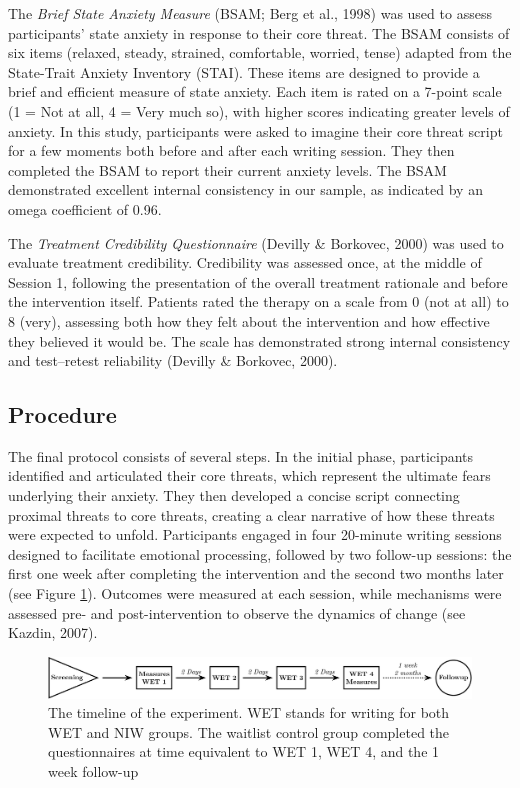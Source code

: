 \documentclass[
  man,floatsintext]{apa7}
\begin{document}
The \emph{Brief State Anxiety Measure} (BSAM; Berg et al., 1998) was used to assess participants' state anxiety in response to their core threat.
The BSAM consists of six items (relaxed, steady, strained, comfortable, worried, tense) adapted from the State-Trait Anxiety Inventory (STAI).
These items are designed to provide a brief and efficient measure of state anxiety.
Each item is rated on a 7-point scale (1 = Not at all, 4 = Very much so), with higher scores indicating greater levels of anxiety.
In this study, participants were asked to imagine their core threat script for a few moments both before and after each writing session.
They then completed the BSAM to report their current anxiety levels.
The BSAM demonstrated excellent internal consistency in our sample, as indicated by an omega coefficient of 0.96.

The \emph{Treatment Credibility Questionnaire} (Devilly \& Borkovec, 2000) was used to evaluate treatment credibility.
Credibility was assessed once, at the middle of Session 1, following the presentation of the overall treatment rationale and before the intervention itself.
Patients rated the therapy on a scale from 0 (not at all) to 8 (very), assessing both how they felt about the intervention and how effective they believed it would be.
The scale has demonstrated strong internal consistency and test--retest reliability (Devilly \& Borkovec, 2000).

\subsection{Procedure}\label{procedure}

The final protocol consists of several steps.
In the initial phase, participants identified and articulated their core threats, which represent the ultimate fears underlying their anxiety.
They then developed a concise script connecting proximal threats to core threats, creating a clear narrative of how these threats were expected to unfold.
Participants engaged in four 20-minute writing sessions designed to facilitate emotional processing, followed by two follow-up sessions: the first one week after completing the intervention and the second two months later (see Figure \ref{fig:progress}).
Outcomes were measured at each session, while mechanisms were assessed pre- and post-intervention to observe the dynamics of change (see Kazdin, 2007).



\begin{figure}
\includegraphics[width=1\linewidth]{../images/progress-resized} \caption{The timeline of the experiment. WET stands for writing for both WET and NIW groups. The waitlist control group completed the questionnaires at time equivalent to WET 1, WET 4, and the 1 week follow-up}\label{fig:progress}
\end{figure}
\end{document}
